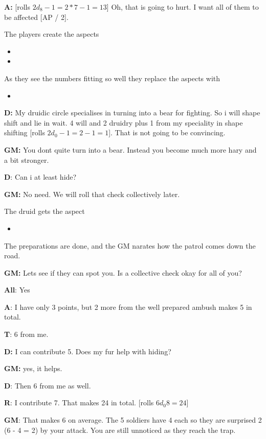 \documentclass[11pt]{article}
\begin{document}
{\textbf{A:} [rolls \(2 d_8 - 1 = 2*7 -1 = 13\)] Oh, that is going to hurt. I want all of them to be affected [AP / 2].

The players create the aspects
\begin{itemize}
\item {}
\item {}
\end{itemize}
As they see the numbers fitting so well they replace the aspects with
\begin{itemize}
\item {}
\end{itemize}

\textbf{D:} My druidic circle specialises in turning into a bear for fighting. So i will shape shift and lie in wait. 4 will and 2 druidry plus 1 from my speciality in shape shifting [rolls \(2 d_0 - 1 = 2 - 1 = 1\)]. That is not going to be convincing.

\textbf{GM:} You dont quite turn into a bear. Instead you become much more hary and a bit stronger.

\textbf{D}: Can i at least hide?

\textbf{GM:} No need. We will roll that check collectively later.

The druid gets the aspect
\begin{itemize}
\item {}
\end{itemize}

The preparations are done, and the GM narates how the patrol comes down the road.

\textbf{GM:} Lets see if they can spot you. Is a collective check okay for all of you?

\textbf{All}: Yes

\textbf{A}: I have only 3 points, but 2 more from the well prepared ambush makes 5 in total.

\textbf{T}: 6 from me.

\textbf{D:} I can contribute 5. Does my fur help with hiding?

\textbf{GM:} yes, it helps.

\textbf{D}: Then 6 from me as well.

\textbf{R}: I contribute 7. That makes 24 in total. [rolls \(6 d_0 8 = 24\)]

\textbf{GM}: That makes 6 on average. The 5 soldiers have 4 each so they are surprised 2 (6 - 4 = 2) by your attack. You are still unnoticed as they reach the trap.

}
\end{document}
